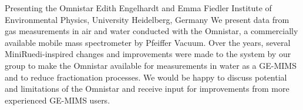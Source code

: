 \begin{conf-abstract}
{Presenting the Omnistar}
{Edith Engelhardt and Emma Fiedler}
{Institute of Environmental Physics, University Heidelberg, Germany}
{We present data from gas measurements in air and water conducted with the Omnistar, a commercially available mobile mass spectrometer by Pfeiffer Vacuum. Over the years, several MiniRuedi-inspired changes and improvements were made to the system by our group to make the Omnistar available for measurements in water as a GE-MIMS and to reduce fractionation processes. We would be happy to discuss potential and limitations of the Omnistar and receive input for improvements from more experienced GE-MIMS users.}
\end{conf-abstract}
